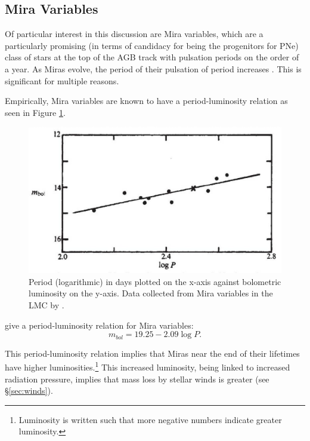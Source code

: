 \documentclass[twocolumn]{aastex63}
\begin{document}
\subsection{Mira Variables} \label{subsec:mira}

Of particular interest in this discussion are Mira variables, which are a particularly promising (in terms of candidacy for being the progenitors for PNe) class of stars at the top of the AGB track with pulsation periods on the order of a year. As Miras evolve, the period of their pulsation of period increases \citep{fadeyev}. This is significant for multiple reasons. 

Empirically, Mira variables are known to have a period-luminosity relation as seen in Figure \ref{fig:period_luminosity}.

\begin{figure}[ht]
    \includegraphics[width=\textwidth]{period_luminosity.png}
    \caption{Period (logarithmic) in days plotted on the x-axis against bolometric luminosity on the y-axis. Data collected from Mira variables in the LMC by \cite{glass}.}
    \label{fig:period_luminosity}
\end{figure}

\cite{glass} give a period-luminosity relation for Mira variables: 
\begin{equation*}
    m_{bol} = 19.25 - 2.09\log P.
\end{equation*}

This period-luminosity relation implies that Miras near the end of their lifetimes have higher luminosities.\footnote{Luminosity is written such that more negative numbers indicate greater luminosity.} This increased luminosity, being linked to increased radiation pressure, implies that mass loss by stellar winds is greater (see \S \ref{sec:winds}). 
\end{document}
